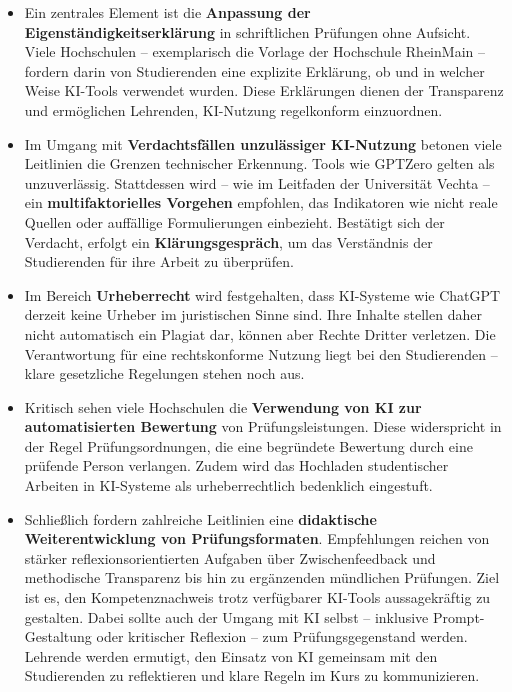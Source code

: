 \documentclass[
  ngerman,
  letterpaper,
  DIV=11]{scrreprt}
\providecommand{\tightlist}{%
  \setlength{\itemsep}{0pt}\setlength{\parskip}{0pt}}
\begin{document}
\begin{itemize}
\tightlist
\item
  Ein zentrales Element ist die \textbf{Anpassung der
  Eigenständigkeitserklärung} in schriftlichen Prüfungen ohne Aufsicht.
  Viele Hochschulen -- exemplarisch die Vorlage der Hochschule RheinMain
  -- fordern darin von Studierenden eine explizite Erklärung, ob und in
  welcher Weise KI-Tools verwendet wurden. Diese Erklärungen dienen der
  Transparenz und ermöglichen Lehrenden, KI-Nutzung regelkonform
  einzuordnen.
\item
  Im Umgang mit \textbf{Verdachtsfällen unzulässiger KI-Nutzung} betonen
  viele Leitlinien die Grenzen technischer Erkennung. Tools wie GPTZero
  gelten als unzuverlässig. Stattdessen wird -- wie im Leitfaden der
  Universität Vechta -- ein \textbf{multifaktorielles Vorgehen}
  empfohlen, das Indikatoren wie nicht reale Quellen oder auffällige
  Formulierungen einbezieht. Bestätigt sich der Verdacht, erfolgt ein
  \textbf{Klärungsgespräch}, um das Verständnis der Studierenden für
  ihre Arbeit zu überprüfen.
\item
  Im Bereich \textbf{Urheberrecht} wird festgehalten, dass KI-Systeme
  wie ChatGPT derzeit keine Urheber im juristischen Sinne sind. Ihre
  Inhalte stellen daher nicht automatisch ein Plagiat dar, können aber
  Rechte Dritter verletzen. Die Verantwortung für eine rechtskonforme
  Nutzung liegt bei den Studierenden -- klare gesetzliche Regelungen
  stehen noch aus.
\item
  Kritisch sehen viele Hochschulen die \textbf{Verwendung von KI zur
  automatisierten Bewertung} von Prüfungsleistungen. Diese widerspricht
  in der Regel Prüfungsordnungen, die eine begründete Bewertung durch
  eine prüfende Person verlangen. Zudem wird das Hochladen studentischer
  Arbeiten in KI-Systeme als urheberrechtlich bedenklich eingestuft.
\item
  Schließlich fordern zahlreiche Leitlinien eine \textbf{didaktische
  Weiterentwicklung von Prüfungsformaten}. Empfehlungen reichen von
  stärker reflexionsorientierten Aufgaben über Zwischenfeedback und
  methodische Transparenz bis hin zu ergänzenden mündlichen Prüfungen.
  Ziel ist es, den Kompetenznachweis trotz verfügbarer KI-Tools
  aussagekräftig zu gestalten. Dabei sollte auch der Umgang mit KI
  selbst -- inklusive Prompt-Gestaltung oder kritischer Reflexion -- zum
  Prüfungsgegenstand werden. Lehrende werden ermutigt, den Einsatz von
  KI gemeinsam mit den Studierenden zu reflektieren und klare Regeln im
  Kurs zu kommunizieren.
\end{itemize}
\end{document}
